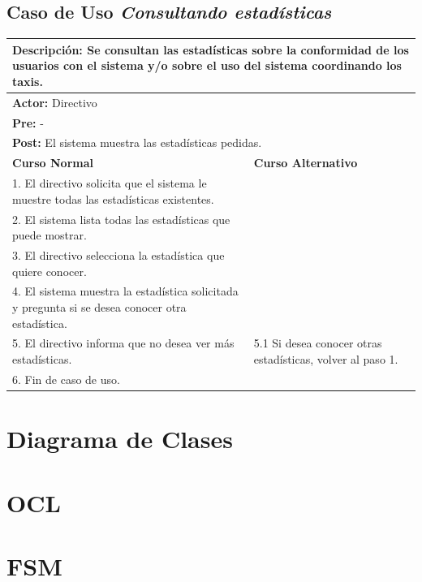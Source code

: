 \documentclass[a4paper]{article}
\begin{document}
\subsection{Caso de Uso \textit{Consultando estad\'isticas}}
\begin{center}
\begin{tabular}{|p{10cm} | p{6cm}|}
\hline
\multicolumn{2}{|p{16cm}|}{\textbf{Descripci\'on:} Se consultan las estad\'isticas sobre la conformidad de los usuarios con el sistema y/o sobre el uso del sistema coordinando los taxis. } \\
\hline
\multicolumn{2}{|l|}{\textbf{Actor:} Directivo } \\
\hline
\multicolumn{2}{|l|}{\textbf{Pre:} - } \\
\hline
\multicolumn{2}{|p{14cm}|}{\textbf{Post:} El sistema muestra las estad\'isticas pedidas. }\\
\hline
\textbf{Curso Normal}  & \textbf{Curso Alternativo} \\ \hline
1. El directivo solicita que el sistema le muestre todas las estad\'isticas existentes. & \\ \hline
2. El sistema lista todas las estad\'isticas que puede mostrar. & \\ \hline
3. El directivo selecciona la estad\'istica que quiere conocer. & \\ \hline
4. El sistema muestra la estad\'istica solicitada y pregunta si se desea conocer otra estad\'istica. &  \\ \hline
5. El directivo informa que no desea ver m\'as estad\'isticas. & 5.1 Si desea conocer otras estad\'isticas, volver al paso 1. \\ \hline
6. Fin de caso de uso. & \\ \hline
\end{tabular}
\end{center}

\section{Diagrama de Clases}

\section{OCL}

\section{FSM}
\end{document}

